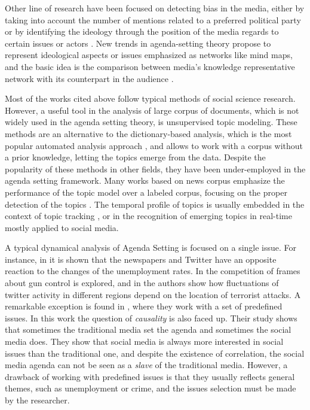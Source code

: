 \documentclass[10pt,letterpaper]{article}
\begin{document}
\par Other line of research have been focused on detecting bias in the media, either by taking into account the number of mentions related  to a preferred political party \cite{lazaridou2016identifying, baumgartner2015all} or by identifying the ideology through the position of the media regards to certain issues or actors \cite{elejalde2018nature, sagarzazu2017hugo}. New trends in agenda-setting theory propose to represent ideological aspects or issues emphasized as networks like mind maps, and the basic idea is the comparison between media's knowledge representative network with its counterpart in the audience \cite{guo2012application, vu2014exploring}.


\par Most of the works cited above follow typical methods of social science research. However, a useful tool in the analysis of large corpus of documents, which is not widely used in the agenda setting theory, is unsupervised topic modeling. These methods are an alternative to the dictionary-based analysis, which is the most popular automated analysis approach \cite{guo2016big}, and allows to work with a corpus without a prior knowledge, letting the topics emerge from the data. Despite the popularity of these methods in other fields, they have been under-employed in the agenda setting framework.
Many works based on news corpus emphasize the performance of the topic model over a labeled corpus, focusing on the proper detection of the topics \cite{dai2010online, po2016topic, brun2000experiment}. The temporal profile of topics is usually embedded in the context of topic tracking \cite{hu2016news, li2017joint}, or in the recognition of emerging topics in real-time \cite{cataldi2010emerging} mostly applied to social media. 

\par A typical dynamical analysis of Agenda Setting is focused on a single issue. For instance, in \cite{soroka2017negativity} it is shown that the newspapers and Twitter have an opposite reaction to the changes of the unemployment rates. In \cite{guggenheim2015dynamics} the competition of frames about gun control is explored, and in \cite{ali2018measuring} the authors show how fluctuations of  twitter activity in different regions depend on the location of terrorist attacks.
A remarkable exception is found in  \cite{russell2014dynamics}, where they work with a set of predefined issues. In this work the question of \emph{causality} is also faced up. Their study shows that sometimes the traditional media set the agenda and sometimes the social media does. They show that social media is always more interested in social issues than the traditional one, and despite the existence of correlation, the social media agenda can not be seen as a \emph{slave} of the traditional media.
However, a drawback of working with predefined issues is that they usually reflects general themes, such as unemployment or crime, and the issues selection must be made by the researcher. 
\end{document}
